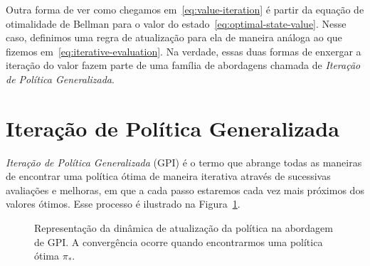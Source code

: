 \documentclass{article}
\begin{document}
        Outra forma de ver como chegamos em~\eqref{eq:value-iteration} é partir da equação de otimalidade de Bellman para o valor do estado~\eqref{eq:optimal-state-value}. Nesse caso, definimos uma regra de atualização para ela de maneira análoga ao que fizemos em~\eqref{eq:iterative-evaluation}. Na verdade, essas duas formas de enxergar a iteração do valor fazem parte de uma família de abordagens chamada de \emph{Iteração de Política Generalizada}.
    
    \section{Iteração de Política Generalizada}
    
        \emph{Iteração de Política Generalizada} (GPI) é o termo que abrange todas as maneiras de encontrar uma política ótima de maneira iterativa através de sucessivas avaliações e melhoras, em que a cada passo estaremos cada vez mais próximos dos valores ótimos. Esse processo é ilustrado na Figura~\ref{diag:generalized-policy-iteration}. 
        
        \vspace{5mm}
        \begin{figure}[ht]
            \centering
            \caption{Representação da dinâmica de atualização da política na abordagem de GPI. A convergência ocorre quando encontrarmos uma política ótima $\pi_*$.}
            \label{diag:generalized-policy-iteration}
        \end{figure}
        
\end{document}
